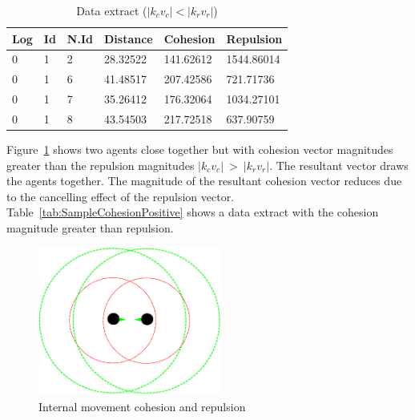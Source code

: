 \documentclass[10pt,journal,letterpaper,twoside]{IEEEtran}
\begin{document}
\begin{table}[H]
\begin{center}
\begin{tabular}{| l | l | l | l | l | l |}
\hline
Log &	Id &	N.Id &	Distance &	{\color{green}Cohesion} &	{\color{red}Repulsion} 	\\ \hline
0 & 1 & 2 & 28.32522 & {\color{green}141.62612} & {\color{red}1544.86014} \\ \hline
0 & 1 & 6 & 41.48517 & {\color{green}207.42586} & {\color{red}721.71736} \\ \hline
0 & 1 & 7 & 35.26412 & {\color{green}176.32064} & {\color{red}1034.27101} \\ \hline
0 & 1 & 8 & 43.54503 & {\color{green}217.72518} & {\color{red}637.90759} \\
\hline
\end{tabular}\caption{Data extract ($|k_cv_c| < |k_rv_r|$)} \label{tab:SampleReplusionPositive}
\end{center}
\end{table}

Figure~\ref{methods:Stability3} shows two agents close together but with cohesion vector magnitudes greater than the repulsion magnitudes $|k_cv_c|~>~|k_rv_r|$. The resultant vector draws the agents together. The magnitude of the resultant cohesion vector reduces due to the cancelling effect of the repulsion vector. Table~\ref{tab:SampleCohesionPositive} shows a data extract with the cohesion magnitude greater than repulsion.

\begin{figure}[H]
\begin{center}
\includegraphics[width=6cm]{figures/Stability3}
\end{center}
\caption{Internal movement cohesion and repulsion} \label{methods:Stability3}
\end{figure}
\end{document}
